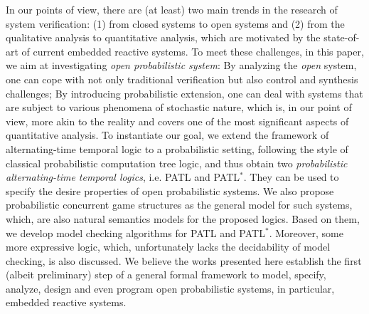 \documentclass[times, 10 pt,twocolumn]{article}
\begin{document}
In our points of view, there are (at least) two main trends in the
research of system verification: (1) from closed systems to open
systems and (2) from the qualitative analysis to quantitative
analysis, which are motivated by the state-of-art of current
embedded reactive systems. To meet these challenges, %
in this paper, we aim at investigating \emph{open probabilistic
system}: By analyzing the \emph{open} system, one can cope with
not only traditional verification but also control and synthesis
challenges; By introducing probabilistic extension, one can deal
with systems that are subject to various phenomena of stochastic
nature, which is, in our point of view, more akin to the reality
and covers one of the most significant aspects of quantitative
analysis. To instantiate our goal, we extend the framework of
alternating-time temporal logic to a probabilistic setting,
following the style of classical probabilistic computation tree
logic, and thus obtain two \emph{probabilistic alternating-time
temporal logics}, i.e. PATL and PATL$^*$. They can be used to
specify the desire properties of open probabilistic systems. We
also propose probabilistic concurrent game structures as the
general model for such systems, which, are also natural semantics
models for the proposed logics. Based on them, we develop model
checking algorithms for PATL and PATL$^*$. Moreover, some more
expressive logic, which, unfortunately lacks the decidability of
model checking, is also discussed. We believe the works presented
here establish the first (albeit preliminary) step of a general
formal framework to model, specify, analyze, design and even
program open probabilistic systems, in particular, embedded
reactive systems.
%
%
\end{document}
